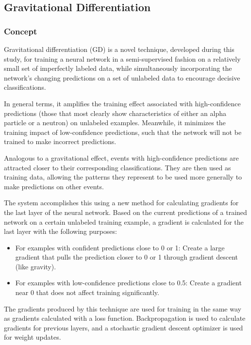 \documentclass[10pt]{article}
\begin{document}
\subsection{Gravitational Differentiation}

\subsubsection{Concept}

Gravitational differentiation (GD) is a novel technique, developed during this study, for training a neural network in a semi-supervised fashion on a relatively small set of imperfectly labeled data, while simultaneously incorporating the network's changing predictions on a set of unlabeled data to encourage decisive classifications.

In general terms, it amplifies the training effect associated with high-confidence predictions (those that most clearly show characteristics of either an alpha particle or a neutron) on unlabeled examples. Meanwhile, it minimizes the training impact of low-confidence predictions, such that the network will not be trained to make incorrect predictions.

Analogous to a gravitational effect, events with high-confidence predictions are attracted closer to their corresponding classifications. They are then used as training data, allowing the patterns they represent to be used more generally to make predictions on other events.

The system accomplishes this using a new method for calculating gradients for the last layer of the neural network. Based on the current predictions of a trained network on a certain unlabeled training example, a gradient is calculated for the last layer with the following purposes:

\begin{itemize}
    \item For examples with confident predictions close to 0 or 1: Create a large gradient that pulls the prediction closer to 0 or 1 through gradient descent (like gravity).
    \item For examples with low-confidence predictions close to 0.5: Create a gradient near 0 that does not affect training significantly.
\end{itemize}

The gradients produced by this technique are used for training in the same way as gradients calculated with a loss function. Backpropagation is used to calculate gradients for previous layers, and a stochastic gradient descent optimizer \cite{sgd} is used for weight updates.
\end{document}

